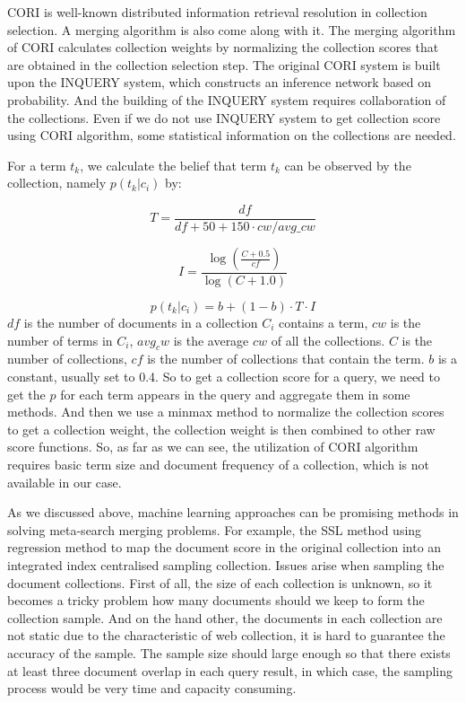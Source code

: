 CORI is well-known distributed information retrieval resolution in collection selection. A merging algorithm is also come along with it. The merging algorithm of CORI calculates collection weights by normalizing the collection scores that are obtained in the collection selection step. The original CORI system is built upon the INQUERY system, which constructs an inference network based on probability. And the building of the INQUERY system requires collaboration of the collections. Even if we do not use INQUERY system to get collection score using CORI algorithm, some statistical information on the collections are needed. 

For a term $t_k$, we calculate the belief that term $t_k$ can be observed by the collection, namely $p(t_k|c_i)$ by:

\begin{equation}
T=\frac{df}{df+50+150\cdot cw/avg\_cw}
\end{equation}

\begin{equation}
I=\frac{\log(\frac{C+0.5}{cf})}{\log{(C+1.0)}}
\end{equation}

\begin{equation}
p(t_k|c_i) = b+ (1-b)\cdot T\cdot I
\end{equation}
$df$ is the number of documents in a collection $C_i$ contains a term, $cw$ is the number of terms in $C_i$, $avg_cw$ is the average $cw$ of all the collections. $C$ is the number of collections, $cf$ is the number of collections that contain the term. $b$ is a constant, usually set to 0.4. So to get a collection score for a query, we need to get the $p$ for each term appears in the query and aggregate them in some methods. And then we use a minmax method to normalize the collection scores to get a collection weight, the collection weight is then combined to other raw score functions. So, as far as we can see, the utilization of CORI algorithm requires basic term size and document frequency of a collection, which is not available in our case.

As we discussed above, machine learning approaches can be promising methods in solving meta-search merging problems. For example, the SSL method using regression method to map the document score in the original collection into an integrated index centralised sampling collection. Issues arise when sampling the document collections. First of all, the size of each collection is unknown, so it becomes a tricky problem how many documents should we keep to form the collection sample. And on the hand other, the documents in each collection are not static due to the characteristic of web collection, it is hard to guarantee the accuracy of the sample. The sample size should large enough so that there exists at least three document overlap in each query result, in which case, the sampling process would be very time  and capacity consuming.

